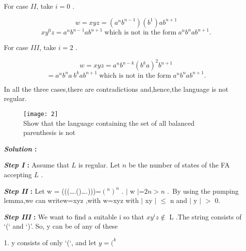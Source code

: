 \documentclass[10pt,a4paper]{article}
\begin{document}
For case $II$, take $i = 0$ .

$$ w=xyz=(a^{n} b^{n-1})(b^{1}) ab^{n+1} $$
$$ xy^{0}z = a^{n} b^{n-1} ab^{n+1}\; \textrm{which is not in the form}\; a^{n} b^{n} ab^{n+1} . $$

For case $III$, take $i = 2$ .

$$ w=xyz=a^{n} b^{n-k}(b^{k}a)^{2} b^{n+1} $$
$$ = a^{n} b^{n}a\: b^{k} ab^{n+1}\; \textrm{which is not in the form}\; a^{n} b^{n} ab^{n+1} . $$

In all the three cases,there are contradictions and,hence,the language is not regular.

\begin{flushleft}
\begin{figure}[h]
  \texttt{[image: 2]}\\Show that the language containing the set of all balanced parenthesis is not
\end{figure}
\end{flushleft}

\begin{flushleft}
  \textbf{\emph{Solution} :}

\textbf{\emph{Step I} :} Assume that $L$ is regular. Let $n$ be the number of states of the FA accepting $L$ .

\textbf{\emph{Step II} :} Let w = (((….()….)))=$(^n)^{n}$ . $|$ w $|$=$2n > n$ .\,\,\,\textrm{By using the pumping lemma,we can write}w=xyz ,with w=xyz with $|$ xy $|$ $\leq$ n and $|$ y $|$ $>$ 0.

\textbf{\emph{Step III} :} We want to find a suitable i so that $xy^{i}z \notin$ L .The string consists of ‘(‘ and ‘)’. So, y can be of any of these

\end{flushleft}

1. y consists of only ‘(‘, and let $y =(^{k}$
\end{document}
